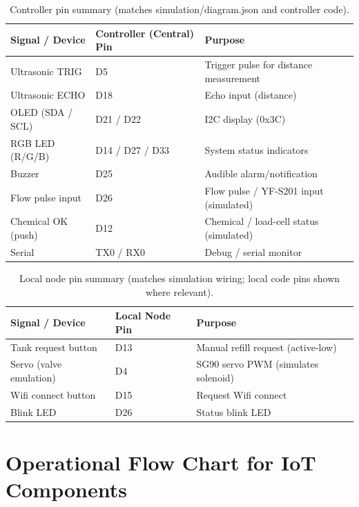 \documentclass[12pt,a4paper]{report}
\begin{document}
\begin{table}[H]
\centering
\small
\setlength{\tabcolsep}{6pt}
\begin{tabularx}{\textwidth}{@{} l l l @{} }
\toprule
\textbf{Signal / Device} & \textbf{Controller (Central) Pin} & \textbf{Purpose} \\
\midrule
Ultrasonic TRIG & D5 & Trigger pulse for distance measurement \\
Ultrasonic ECHO & D18 & Echo input (distance) \\
OLED (SDA / SCL) & D21 / D22 & I2C display (0x3C) \\
RGB LED (R/G/B) & D14 / D27 / D33 & System status indicators \\
Buzzer & D25 & Audible alarm/notification \\
Flow pulse input & D26 & Flow pulse / YF-S201 input (simulated) \\
Chemical OK (push) & D12 & Chemical / load-cell status (simulated) \\
Serial & TX0 / RX0 & Debug / serial monitor \\
\bottomrule
\end{tabularx}
\caption{Controller pin summary (matches simulation/diagram.json and controller code).}
\end{table}

\begin{table}[H]
\centering
\small
\setlength{\tabcolsep}{6pt}
\begin{tabularx}{\textwidth}{@{} l l l @{} }
\toprule
\textbf{Signal / Device} & \textbf{Local Node Pin} & \textbf{Purpose} \\
\midrule
Tank request button & D13 & Manual refill request (active-low) \\
Servo (valve emulation) & D4 & SG90 servo PWM (simulates solenoid) \\
Wifi connect button & D15 & Request Wifi connect \\
Blink LED & D26 & Status blink LED \\
\bottomrule
\end{tabularx}
\caption{Local node pin summary (matches simulation wiring; local code pins shown where relevant).}
\end{table}


\chapter[Operational Flow Chart for IoT Components]{Operational Flow Chart for IoT\\Components}
\end{document}
